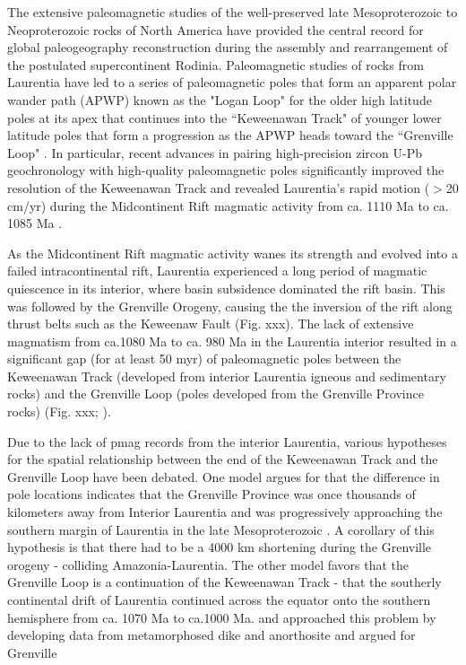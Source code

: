 \documentclass[draft]{agujournal2019}
\begin{document}
The extensive paleomagnetic studies of the well-preserved late Mesoproterozoic to Neoproterozoic rocks of North America have provided the central record for global paleogeography reconstruction during the assembly and rearrangement of the postulated supercontinent Rodinia. Paleomagnetic studies of rocks from Laurentia have led to a series of paleomagnetic poles that form an apparent polar wander path (APWP) known as the "Logan Loop" for the older high latitude poles at its apex that continues into the ``Keweenawan Track" of younger lower latitude poles that form a progression as the APWP heads toward the ``Grenville Loop" \citep{Swanson-Hysell2019a}. In particular, recent advances in pairing high-precision zircon U-Pb geochronology with high-quality paleomagnetic poles significantly improved the resolution of the Keweenawan Track and revealed Laurentia's rapid motion ($>$20 cm/yr) during the Midcontinent Rift magmatic activity from ca. 1110 Ma to ca. 1085 Ma \citep{Swanson-Hysell2019a}. 

As the Midcontinent Rift magmatic activity wanes its strength and evolved into a failed intracontinental rift, Laurentia experienced a long period of magmatic quiescence in its interior, where basin subsidence dominated the rift basin. This was followed by the Grenville Orogeny, causing the the inversion of the rift along thrust belts such as the Keweenaw Fault (Fig. xxx). The lack of extensive magmatism from ca.1080 Ma to ca. 980 Ma in the Laurentia interior resulted in a significant gap (for at least 50 myr) of paleomagnetic poles between the Keweenawan Track (developed from interior Laurentia igneous and sedimentary rocks) and the Grenville Loop (poles developed from the Grenville Province rocks) (Fig. xxx; \cite{Swanson-Hysell2019a}).  

Due to the lack of pmag records from the interior Laurentia, various hypotheses for the spatial relationship between the end of the Keweenawan Track and the Grenville Loop have been debated. One model argues for that the difference in pole locations indicates that the Grenville Province was once thousands of kilometers away from Interior Laurentia and was progressively approaching the southern margin of Laurentia in the late Mesoproterozoic \citep{Halls2015}. A corollary of this hypothesis is that there had to be a 4000 km shortening during the Grenville orogeny - colliding Amazonia-Laurentia. The other model favors that the Grenville Loop is a continuation of the Keweenawan Track - that the southerly continental drift of Laurentia continued across the equator onto the southern hemisphere from ca. 1070 Ma to ca.1000 Ma. and  approached this problem by developing data from metamorphosed dike and anorthosite and argued for Grenville  
\end{document}
